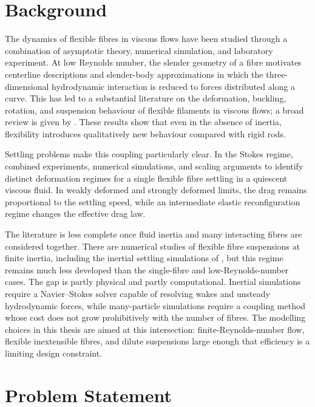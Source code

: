 \section{Background}

The dynamics of flexible fibres in viscous flows have been studied through a
combination of asymptotic theory, numerical simulation, and laboratory
experiment. %
At low Reynolds number, the slender geometry of a fibre motivates
centerline descriptions and slender-body approximations in which the
three-dimensional hydrodynamic interaction is reduced to forces distributed
along a curve. This has led to a substantial literature on the deformation,
buckling, rotation, and suspension behaviour of flexible filaments in viscous
flows; a broad review is given by \textcite{du_roure_dynamics_2019}. These
results show that even in the absence of inertia, flexibility introduces
qualitatively new behaviour compared with rigid rods.

Settling problems make this coupling particularly clear. In the Stokes regime,
\textcite{marchetti_deformation_2018} combined experiments, numerical
simulations, and scaling arguments to identify distinct deformation regimes for
a single flexible fibre settling in a quiescent viscous fluid. In weakly
deformed and strongly deformed limits, the drag remains proportional to the
settling speed, while an intermediate elastic reconfiguration regime changes
the effective drag law.

The literature is less complete once fluid inertia and many interacting fibres
are considered together. There are numerical studies of flexible fibre
suspensions at finite inertia, including the inertial settling simulations of
\textcite{banaei_inertial_2020}, but this regime remains much less developed
than the single-fibre and low-Reynolds-number cases. The gap is partly physical
and partly computational. Inertial simulations require a Navier--Stokes solver
capable of resolving wakes and unsteady hydrodynamic forces, while
many-particle simulations require a coupling method whose cost does not grow
prohibitively with the number of fibres. The modelling choices in this thesis
are aimed at this intersection: finite-Reynolds-number flow, flexible
inextensible fibres, and dilute suspensions large enough that efficiency is a
limiting design constraint.

\section{Problem Statement}

